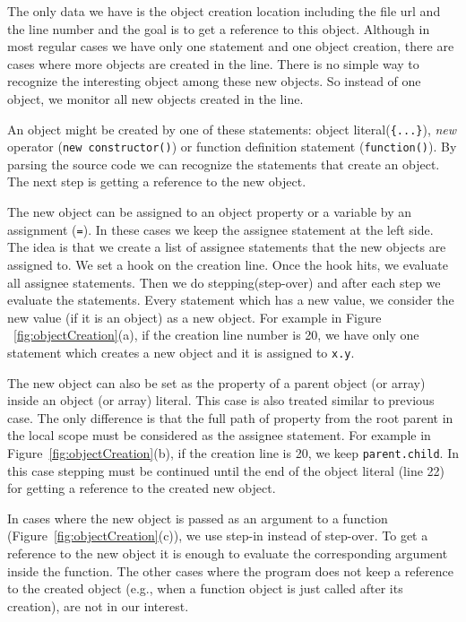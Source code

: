 \documentclass{sig-alternate}
\begin{document}
The only data we have is the object creation location including the
file url and the line number and the goal is to get a reference to
this object. Although in most regular cases we have only one
statement and one object creation, there are cases where more
objects are created in the line. There is no simple way to
recognize the interesting object among these new objects. So instead
of one object, we monitor all new objects created in the line.

An object might be created by one of these statements: object
literal(\texttt{\{...\}}), \textit{new} operator (\texttt{new 
constructor()}) or function definition statement (\texttt{function()}). 
By parsing the source code we can recognize the statements that
create an object. The next step is getting a reference to the new object.

The new object can be assigned to an object property or a variable by
an assignment (\texttt{=}). In these cases we keep the assignee statement 
at the left side. The idea is that we create a list of assignee statements 
that the new objects are assigned to. We set a hook on the creation
line. Once the hook hits, we evaluate all assignee statements. Then 
we do stepping(step-over) and after each step we evaluate the
statements. Every statement which has a new value, we consider the new
value (if it is an object) as a new object. For example in Figure
~\ref{fig:objectCreation}(a), if the creation line number is 20, we
have only one statement which creates a new object and it is assigned
to \texttt{x.y}.

The new object can also be set as the property of a parent object 
(or array) inside an object (or array) literal. This case is also treated 
similar to previous case. The only difference is that the full path of property 
from the root parent in the local scope must be considered as the assignee statement. For
example in Figure~\ref{fig:objectCreation}(b), if the creation line
is 20, we keep \texttt{parent.child}. In this case stepping
must be continued until the end of the object literal (line 22) for getting a reference
to the created new object.

In cases where the new object is passed as an 
argument to a function (Figure~\ref{fig:objectCreation}(c)), we use step-in instead of step-over. 
To get a reference to the new object
it is enough to evaluate the corresponding argument inside the function. The other cases
where the program does not keep a reference to the created object (e.g., when a function object is
just called after its creation), are not in our interest. 
\end{document}
